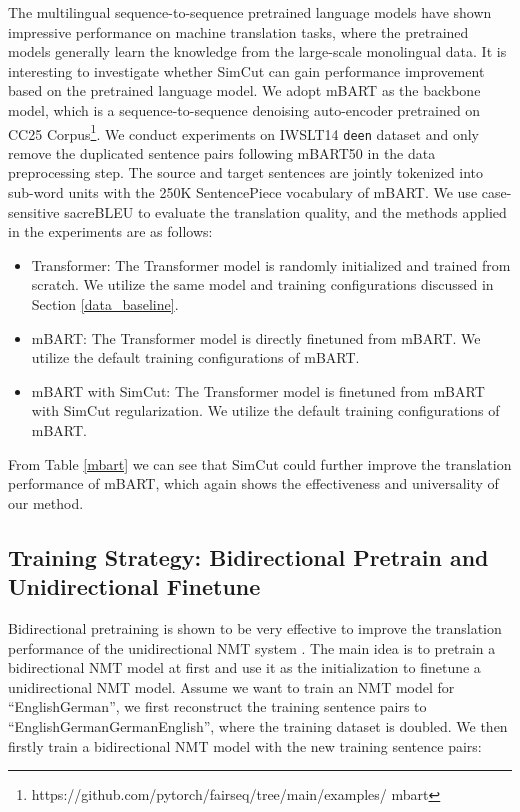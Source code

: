 \documentclass[11pt]{article}
\begin{document}
The multilingual sequence-to-sequence pretrained language models \cite{song2019mass, liu2020multilingual, xue-etal-2021-mt5} have shown impressive performance on machine translation tasks, where the pretrained models generally learn the knowledge from the large-scale monolingual data. It is interesting to investigate whether SimCut can gain performance improvement based on the pretrained language model. We adopt mBART \cite{liu2020multilingual} as the backbone model, which is a sequence-to-sequence denoising auto-encoder pretrained on CC25 Corpus\footnote{https://github.com/pytorch/fairseq/tree/main/examples/ mbart}. We conduct experiments on IWSLT14 \texttt{de}\texttt{en} dataset and only remove the duplicated sentence pairs following mBART50 \cite{tang2021multilingual} in the data preprocessing step. The source and target sentences are jointly tokenized into sub-word units with the 250K SentencePiece \cite{kudo-richardson-2018-sentencepiece} vocabulary of mBART. We use case-sensitive sacreBLEU \cite{post-2018-call} to evaluate the translation quality, and the methods applied in the experiments are as follows:
\begin{itemize}
\item Transformer: The Transformer model is randomly initialized and trained from scratch. We utilize the same model and training configurations discussed in Section \ref{data_baseline}.
\item mBART: The Transformer model is directly finetuned from mBART. We utilize the default training configurations of mBART.
\item mBART with SimCut: The Transformer model is finetuned from mBART with SimCut regularization. We utilize the default training configurations of mBART.
\end{itemize}
From Table \ref{mbart} we can see that SimCut could further improve the translation performance of mBART, which again shows the effectiveness and universality of our method.





\subsection{Training Strategy: Bidirectional Pretrain and Unidirectional Finetune}

Bidirectional pretraining is shown to be very effective to improve the translation performance of the unidirectional NMT system \cite{ding2021improving, xu-etal-2021-bert}. The main idea is to pretrain a bidirectional NMT model at first and use it as the initialization to finetune a unidirectional NMT model. Assume we want to train an NMT model for ``EnglishGerman'', we first reconstruct the training sentence pairs to ``EnglishGermanGermanEnglish'', where the training dataset is doubled. We then firstly train a bidirectional NMT model with the new training sentence pairs:
\end{document}
